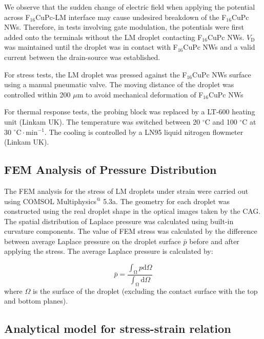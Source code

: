 We observe that the sudden change of electric field when applying the
potential across F\(_{\text{16}}\)CuPc-LM interface may cause
undesired breakdown of the F\(_{\text{16}}\)CuPc NWs. Therefore, in
tests involving gate modulation, the potentials were first added onto
the terminals without the LM droplet contacting F\(_{\text{16}}\)CuPc
NWs.  \(V_{\mathrm{D}}\) was maintained until the droplet was in
contact with F\(_{\text{16}}\)CuPc NWs and a valid current between the
drain-source was established.

For stress tests, the LM droplet was pressed against the F\(_{\text{16}}\)CuPc
NWs surface using a manual pneumatic valve. The moving distance of the
droplet was controlled within 200 \(\mu \mathrm{m}\) to avoid mechanical
deformation of F\(_{\text{16}}\)CuPc NWs

For thermal response tests, the probing block was replaced by a LT-600
heating unit (Linkam UK). The temperature was switched between 20
\(^{\circ} \mathrm{C}\) and 100 \(^{\circ} \mathrm{C}\) at 30 \(^{\circ}
\mathrm{C} \cdot \mathrm{min}^{-1}\). The cooling is controlled by a
LN95 liquid nitrogen flowmeter (Linkam UK).

\subsection*{FEM Analysis of Pressure Distribution}
\label{sec:small-orge90523c}
The FEM analysis for the stress of LM droplets under strain were
carried out using COMSOL Multiphysics\(^{\text{@}}\) 5.3a. The geometry for
each droplet was constructed using the real droplet shape in the
optical images taken by the CAG. The spatial distribution of
Laplace pressure was calculated using built-in curvature
components. The value of FEM stress was calculated by the
difference between average Laplace pressure on the droplet surface
\(\bar{p}\) before and after applying the stress. The average Laplace
pressure is calculated by:

\begin{equation}
\label{eq:small-7}
\bar{p} = {\displaystyle \frac{\int_{\mathrm{\Omega}} p \mathrm{d} \Omega}{\int_{\mathrm{\Omega}} \mathrm{d} \Omega}}
\end{equation}
where \(\Omega\) is the surface of the droplet (excluding the contact
surface with the top and bottom planes).

\subsection*{Analytical model for stress-strain relation}
\label{sec:small-orgc12d6dd}

